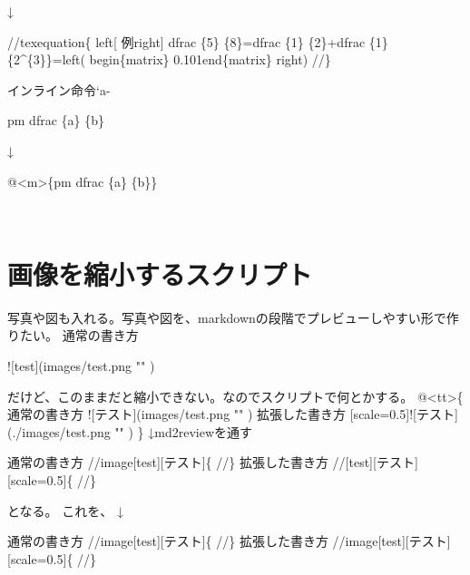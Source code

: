 ↓

\begin{reviewemlist}
//texequation\{
\reviewbackslash{}left[ 例\reviewbackslash{}right] \reviewbackslash{}dfrac \{5\} \{8\}=\reviewbackslash{}dfrac \{1\} \{2\}+\reviewbackslash{}dfrac \{1\} \{2\textasciicircum{}\{3\}\}=\reviewbackslash{}left( \reviewbackslash{}begin\{matrix\} 0.101\reviewbackslash{}end\{matrix\} \reviewbackslash{}right)
//\}
\end{reviewemlist}

インライン命令`a{-}\textdollar{}\textdollar{}

\begin{reviewemlist}
\textdollar{}\reviewbackslash{}pm \reviewbackslash{}dfrac \{a\} \{b\}\textdollar{}
\end{reviewemlist}

↓

\begin{reviewemlist}
@\textless{}m\textgreater{}\{\reviewbackslash{}pm \reviewbackslash{}dfrac \{a\reviewbackslash{}\reviewbackslash{}\} \{b\reviewbackslash{}\reviewbackslash{}\}\}
\end{reviewemlist}

　

\section{画像を縮小するスクリプト}
\label{sec:4-5}

写真や図も入れる。写真や図を、markdownの段階でプレビューしやすい形で作りたい。
通常の書き方

\begin{reviewemlist}
![test](images/test.png  "" )
\end{reviewemlist}

だけど、このままだと縮小できない。なのでスクリプトで何とかする。
@\textless{}tt\textgreater{}\{
通常の書き方
![テスト](images/test.png  "" )
拡張した書き方
[scale=0.5]![テスト](./images/test.png  "" )
\}
↓md2reviewを通す

\begin{reviewemlist}
通常の書き方
//image[test][テスト]\{
//\}
拡張した書き方
//[test][テスト][scale=0.5]\{
//\}
\end{reviewemlist}

となる。
これを、
↓

\begin{reviewemlist}
通常の書き方
//image[test][テスト]\{
//\}
拡張した書き方
//image[test][テスト][scale=0.5]\{
//\}
\end{reviewemlist}

